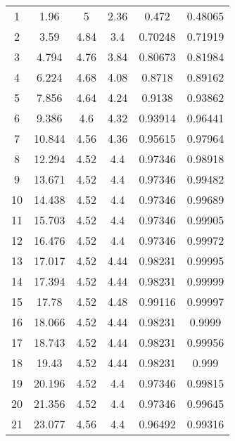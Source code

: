 \documentclass[a4paper]{article}
\begin{document}
\begin{table}[H]
\begin{center}
{\begin{tabular}{|c|c|c|c|c|c|}
\hline
1  & 1.96   & 5    & 2.36 & 0.472   & 0.48065     \\
2  & 3.59   & 4.84 & 3.4  & 0.70248 & 0.71919     \\
3  & 4.794  & 4.76 & 3.84 & 0.80673 & 0.81984     \\
4  & 6.224  & 4.68 & 4.08 & 0.8718  & 0.89162     \\
5  & 7.856  & 4.64 & 4.24 & 0.9138  & 0.93862     \\
6  & 9.386  & 4.6  & 4.32 & 0.93914 & 0.96441     \\
7  & 10.844 & 4.56 & 4.36 & 0.95615 & 0.97964     \\
8  & 12.294 & 4.52 & 4.4  & 0.97346 & 0.98918     \\
9  & 13.671 & 4.52 & 4.4  & 0.97346 & 0.99482     \\
10 & 14.438 & 4.52 & 4.4  & 0.97346 & 0.99689     \\
11 & 15.703 & 4.52 & 4.4  & 0.97346 & 0.99905     \\
12 & 16.476 & 4.52 & 4.4  & 0.97346 & 0.99972     \\
13 & 17.017 & 4.52 & 4.44 & 0.98231 & 0.99995     \\
14 & 17.394 & 4.52 & 4.44 & 0.98231 & 0.99999 \\
15 & 17.78  & 4.52 & 4.48 & 0.99116 & 0.99997     \\
16 & 18.066 & 4.52 & 4.44 & 0.98231 & 0.9999      \\
17 & 18.743 & 4.52 & 4.44 & 0.98231 & 0.99956     \\
18 & 19.43  & 4.52 & 4.44 & 0.98231 & 0.999       \\
19 & 20.196 & 4.52 & 4.4  & 0.97346 & 0.99815     \\
20 & 21.356 & 4.52 & 4.4  & 0.97346 & 0.99645     \\
21 & 23.077 & 4.56 & 4.4  & 0.96492 & 0.99316      \\
\hline
\end{tabular}
    }
  \end{center}
\end{table}

%
%
%
\end{document}
